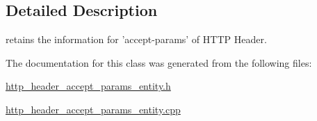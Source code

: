 \subsection{Detailed Description}
retains the information for 'accept-\/params' of H\-T\-T\-P Header. 

The documentation for this class was generated from the following files\-:\begin{DoxyCompactItemize}
\item 
\hyperlink{http__header__accept__params__entity_8h}{http\-\_\-header\-\_\-accept\-\_\-params\-\_\-entity.\-h}\item 
\hyperlink{http__header__accept__params__entity_8cpp}{http\-\_\-header\-\_\-accept\-\_\-params\-\_\-entity.\-cpp}\end{DoxyCompactItemize}
